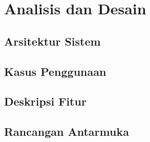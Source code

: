 \chapter{Analisis dan Desain}
    \section{Arsitektur Sistem}
        \Blindtext[5][1]
    \section{Kasus Penggunaan}
        \Blindtext[5][1]
    \section{Deskripsi Fitur}
        \Blindtext[5][1]
    \section{Rancangan Antarmuka}
        \Blindtext[5][1]
    \cleardoublepage
